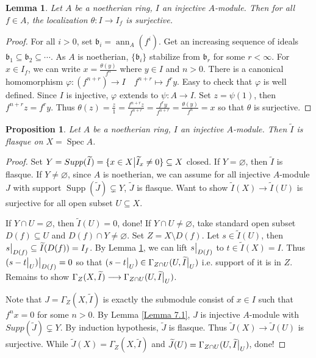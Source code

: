 \documentclass{ctexart}
\newtheorem{proposition}{Proposition}[section]
\newtheorem{lemma}{Lemma}[section]
\newcommand{\spec}{\operatorname{Spec}}
\newcommand{\support}{\operatorname{Supp}}
\newcommand{\annihilator}{\operatorname{ann}}
\begin{document}
\begin{lemma}
    Let $A$ be a noetherian ring, $I$ an injective $A$-module.
    Then for all $f\in A$, the localization $\theta: I \longrightarrow I_{f}$ is surjective.
    \label{Lemma 7.2}
\end{lemma}
\begin{proof}
    For all $i > 0$, set $\mathfrak{b}_{i} = \annihilator_{A}(f^{i})$.
    Get an increasing sequence of ideals $\mathfrak{b}_{1} \subseteq \mathfrak{b}_{2} \subseteq \cdots$.
    As $A$ is noetherian, $\{\mathfrak{b}_{i}\}$ stabilize from $\mathfrak{b}_{r}$ for some $r < \infty$.
    For $x\in I_{f}$, we can write $x = \frac{\theta(y)}{f^{n}}$ where $y\in I$ and $n > 0$.
    There is a canonical homomorphism $\varphi: (f^{n + r}) \longrightarrow I\quad f^{n + r} \longmapsto f^{r}y$.
    Easy to check that $\varphi$ is well defined.
    Since $I$ is injective, $\varphi$ extends to $\psi: A \longrightarrow I$.
    Set $z = \psi(1)$, then $f^{n + r}z = f^{r}y$.
    Thus $\theta(z) = \frac{z}{1} = \frac{f^{n + r}z}{f^{n + r}} = \frac{f^{r}y}{f^{n + r}} = \frac{\theta(y)}{f^{n}} = x$ so that $\theta$ is surjective.
\end{proof}
\begin{proposition}
    Let $A$ be a noetherian ring, $I$ an injective $A$-module.
    Then $\widetilde{I}$ is flasque on $X = \spec A$.
    \label{Proposition 7.6}
\end{proposition}
\begin{proof}
    Set $Y = Supp(\widetilde{I}) = \{x\in X \big{|} \widetilde{I}_{x} \neq 0\} \subseteq X$ closed.
    If $Y = \varnothing$, then $\widetilde{I}$ is flasque.
    If $Y \neq \varnothing$, since $A$ is noetherian, we can assume for all injective $A$-module $J$ with support $\support (\widetilde{J}) \subsetneq Y$, $\widetilde{J}$ is flasque.
    Want to show $\widetilde{I}(X) \longrightarrow \widetilde{I}(U)$ is surjective for all open subset $U \subseteq X$.
    \par
    If $Y \cap U = \varnothing$, then $\widetilde{I}(U) = 0$, done!
    If $Y \cap U \neq \varnothing$, take standard open subset $D(f) \subseteq U$ and $D(f) \cap Y \neq \varnothing$.
    Set $Z = X \setminus D(f)$.
    Let $s\in \widetilde{I}(U)$, then $s\big{|}_{D(f)} \subseteq \widetilde{I}(D(f)) = I_{f}$.
    By Lemma \ref{Lemma 7.2}, we can lift $s\big{|}_{D(f)}$ to $t\in \widetilde{I}(X) = I$.
    Thus $(s - t\big{|}_{U})\big{|}_{D(f)} = 0$ so that $(s - t\big{|}_{U})\in \Gamma_{Z \cap U}(U, \widetilde{I}\big{|}_{U})$ i.e. support of it is in $Z$.
    Remains to show $\Gamma_{Z}(X, \widetilde{I}) \longrightarrow \Gamma_{Z \cap U}(U, \widetilde{I}\big{|}_{U})$.
    \par
    Note that $J = \Gamma_{Z}(X, \widetilde{I})$ is exactly the submodule consist of $x\in I$ such that $f^{n}x = 0$ for some $n > 0$.
    By Lemma \ref{Lemma 7.1}, $J$ is injective $A$-module with $Supp(\widetilde{J}) \subsetneq Y$.
    By induction hypothesis, $\widetilde{J}$ is flasque.
    Thus $\widetilde{J}(X) \longrightarrow \widetilde{J}(U)$ is surjective.
    While $\widetilde{J}(X) = \Gamma_{Z}(X, \widetilde{I})$ and $\widetilde{J}(U) = \Gamma_{Z \cap U}(U, \widetilde{I}\big{|}_{U})$, done!
\end{proof}
\end{document}
